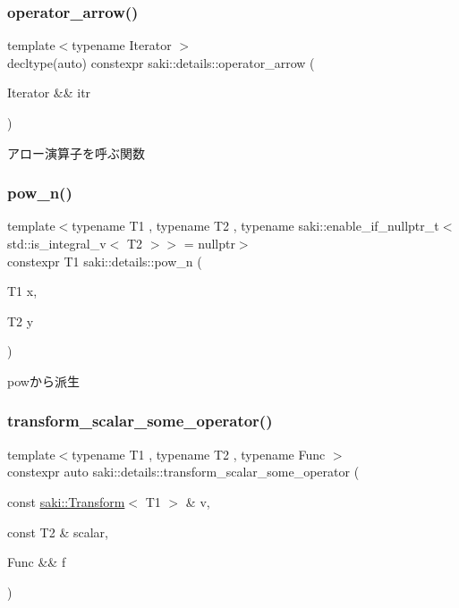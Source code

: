 \subsubsection{\texorpdfstring{operator\+\_\+arrow()}{operator\_arrow()}}
{\footnotesize\ttfamily template$<$typename Iterator $>$ \\
decltype(auto) constexpr saki\+::details\+::operator\+\_\+arrow (\begin{DoxyParamCaption}\item[{Iterator \&\&}]{itr }\end{DoxyParamCaption})}



アロー演算子を呼ぶ関数 

\mbox{\label{namespacesaki_1_1details_a30b4cd78c970618ee2886123c28e4041}} 
\subsubsection{\texorpdfstring{pow\+\_\+n()}{pow\_n()}}
{\footnotesize\ttfamily template$<$typename T1 , typename T2 , typename saki\+::enable\+\_\+if\+\_\+nullptr\+\_\+t$<$ std\+::is\+\_\+integral\+\_\+v$<$ T2 $>$$>$  = nullptr$>$ \\
constexpr T1 saki\+::details\+::pow\+\_\+n (\begin{DoxyParamCaption}\item[{T1}]{x,  }\item[{T2}]{y }\end{DoxyParamCaption})}



powから派生 

\mbox{\label{namespacesaki_1_1details_a2f5694f4bcf7f45e946384285562521e}} 
\subsubsection{\texorpdfstring{transform\+\_\+scalar\+\_\+some\+\_\+operator()}{transform\_scalar\_some\_operator()}}
{\footnotesize\ttfamily template$<$typename T1 , typename T2 , typename Func $>$ \\
constexpr auto saki\+::details\+::transform\+\_\+scalar\+\_\+some\+\_\+operator (\begin{DoxyParamCaption}\item[{const \mbox{\hyperlink{classsaki_1_1_transform}{saki\+::\+Transform}}$<$ T1 $>$ \&}]{v,  }\item[{const T2 \&}]{scalar,  }\item[{Func \&\&}]{f }\end{DoxyParamCaption})}



